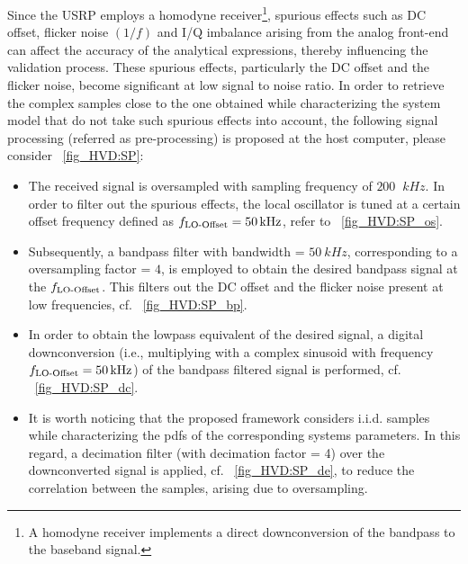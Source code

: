 Since the USRP employs a homodyne receiver\footnote{A homodyne receiver implements a direct downconversion of the bandpass to the baseband signal.}, spurious effects such as DC offset, flicker noise $(1/f)$ and  I/Q imbalance arising from the analog front-end can affect the accuracy of the analytical expressions, thereby influencing the validation process. These spurious effects, particularly the DC offset and the flicker noise, become significant at low signal to noise ratio. In order to retrieve the complex samples close to the one obtained while characterizing the system model that do not take such spurious effects into account, the following signal processing (referred as pre-processing) is proposed at the host computer, please consider \figurename~\ref{fig_HVD:SP}:
\begin{itemize}
\item The received signal is oversampled with sampling frequency of $200$ $\SI{}{kHz}$. 
In order to filter out the spurious effects, the local oscillator is tuned at a certain offset frequency defined as $f_{\text{LO-Offset}} = \SI{50}{kHz}$, refer to \figurename~\ref{fig_HVD:SP_os}. 
\item Subsequently, a bandpass filter with bandwidth = $\SI{50}{kHz}$, corresponding to a oversampling factor = $4$, is employed to obtain the desired bandpass signal at the $f_{\text{LO-Offset}}$. This filters out the DC offset and the flicker noise present at low frequencies, cf. \figurename~\ref{fig_HVD:SP_bp}. 
\item In order to obtain the lowpass equivalent of the desired signal, a digital downconversion (i.e., multiplying with a complex sinusoid with frequency $f_{\text{LO-Offset}} = \SI{50}{kHz}$) of the bandpass filtered signal is performed, cf. \figurename~\ref{fig_HVD:SP_dc}. %
\item It is worth noticing that the proposed framework considers i.i.d. samples while characterizing the pdfs of the corresponding systems parameters. In this regard, a decimation filter (with decimation factor = 4) over the downconverted signal is applied, cf. \figurename~\ref{fig_HVD:SP_de}, to reduce the correlation between the samples, arising due to oversampling. 
\end{itemize}

